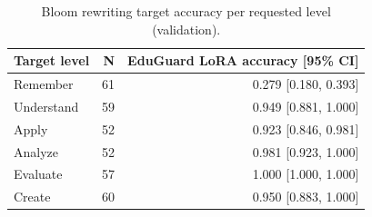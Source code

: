 \begin{table}[t]
\centering
\caption{Bloom rewriting target accuracy per requested level (validation).}
\label{tab:t4_bloom_per_level}
\begin{tabular}{lrr}
\toprule
Target level & N & EduGuard LoRA accuracy [95\% CI] \\
\midrule
Remember & 61 & 0.279 [0.180, 0.393] \\
Understand & 59 & 0.949 [0.881, 1.000] \\
Apply & 52 & 0.923 [0.846, 0.981] \\
Analyze & 52 & 0.981 [0.923, 1.000] \\
Evaluate & 57 & 1.000 [1.000, 1.000] \\
Create & 60 & 0.950 [0.883, 1.000] \\
\bottomrule
\end{tabular}
\end{table}
